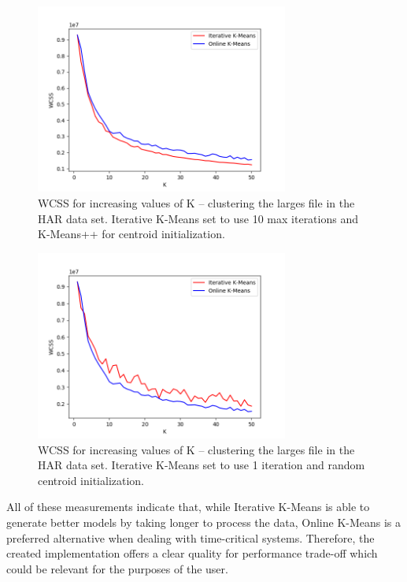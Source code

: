 \documentclass{l4proj}
\begin{document}
\begin{figure}[H]
	\centering
    \label{fig:res8}
    \includegraphics[width=0.74\textwidth]{images/result8}
    \caption{WCSS for increasing values of K -- clustering the larges file in the HAR data set. Iterative K-Means set to use 10 max iterations and K-Means++ for centroid initialization. } 
\end{figure}

\begin{figure}[H]
	\centering
    \label{fig:res9}
    \includegraphics[width=0.74\textwidth]{images/result9}
    \caption{WCSS for increasing values of K -- clustering the larges file in the HAR data set. Iterative K-Means set to use 1 iteration and random centroid initialization. } 
\end{figure}

All of these measurements indicate that, while Iterative K-Means is able to generate better models by taking longer to process the data, Online K-Means is a preferred alternative when dealing with time-critical systems. Therefore, the created implementation offers a clear quality for performance trade-off which could be relevant for the purposes of the user.
\end{document}
